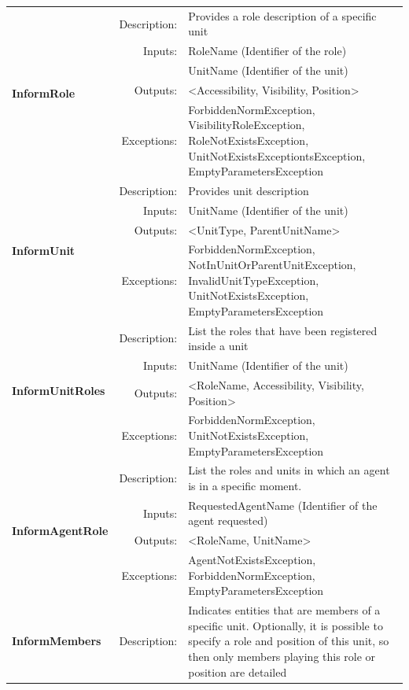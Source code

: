 \begin{longtable}{|p{3cm}|r|p{8.5cm}|}
  \hline
  \multirow{5}{*}{\textbf{InformRole}} & Description: & Provides a role description of a specific unit \\ \cline{2-3}
    & Inputs: & RoleName (Identifier of the role) \\ \cline{3-3}
    &  & UnitName (Identifier of the unit) \\ \cline{2-3}
    & Outputs:     & \textless Accessibility, Visibility, Position\textgreater \\ \cline{2-3}
    & Exceptions:  & ForbiddenNormException, VisibilityRoleException, RoleNotExistsException, UnitNotExistsExceptiontsException, EmptyParametersException \\ \hline
  \hline
  \multirow{4}{*}{\textbf{InformUnit}} & Description: & Provides unit description \\ \cline{2-3}
    & Inputs: & UnitName (Identifier of the unit) \\ \cline{2-3}
    & Outputs:     & \textless UnitType, ParentUnitName\textgreater \\ \cline{2-3}
    & Exceptions:  & ForbiddenNormException, NotInUnitOrParentUnitException, InvalidUnitTypeException, UnitNotExistsException, EmptyParametersException \\ \hline
  \hline
  \multirow{4}{*}{\textbf{InformUnitRoles}} & Description: & List the roles that have been registered inside a unit \\ \cline{2-3}
    & Inputs: & UnitName (Identifier of the unit) \\ \cline{2-3}
    & Outputs:     & \textless RoleName, Accessibility, Visibility, Position\textgreater \\ \cline{2-3}
    & Exceptions:  & ForbiddenNormException, UnitNotExistsException, EmptyParametersException \\ \hline
  \hline
  \multirow{4}{*}{\textbf{InformAgentRole}} & Description: & List the roles and units in which an agent is in a specific moment. \\ \cline{2-3}
    & Inputs: & RequestedAgentName (Identifier of the agent requested) \\ \cline{2-3}
    & Outputs:     & \textless RoleName, UnitName\textgreater \\ \cline{2-3}
    & Exceptions:  & AgentNotExistsException, ForbiddenNormException, EmptyParametersException \\ \hline
  \hline
  \multirow{6}{*}{\textbf{InformMembers}} & Description: & Indicates entities that are members of a specific unit. Optionally, it is possible to specify a role and position of this unit, so then only members playing this role or position are detailed \\ \cline{2-3}

\end{longtable}
